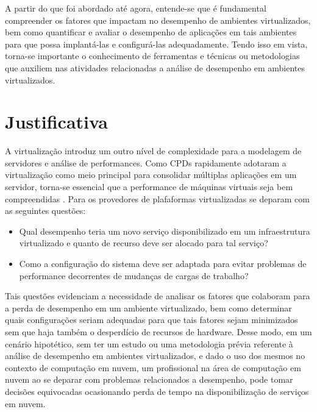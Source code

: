 A partir do que foi abordado até agora, entende-se que é fundamental compreender os fatores que impactam no desempenho de ambientes virtualizados, bem como quantificar e avaliar o desempenho de aplicações em tais ambientes para que possa implantá-las e configurá-las adequadamente. Tendo isso em vista, torna-se importante o conhecimento de ferramentas e técnicas ou metodologias que auxiliem nas atividades relacionadas a análise de desempenho em ambientes virtualizados. 



\section{Justificativa}
A virtualização introduz um outro nível de complexidade para a modelagem de servidores e análise de performances. Como CPDs rapidamente adotaram a virtualização como meio principal para consolidar múltiplas aplicações em um servidor, torna-se essencial que a performance de máquinas virtuais seja bem compreendidas \cite{ticko2010}. Para  os provedores de plafaformas virtualizadas se deparam com as seguintes questões:

\begin{itemize}
  \item Qual desempenho teria um novo serviço disponibilizado em um infraestrutura virtualizado e quanto de recurso deve ser alocado para tal serviço?

  \item Como a configuração do sistema deve ser adaptada para evitar problemas de performance decorrentes de mudanças de cargas de trabalho?
\end{itemize}


Tais questões evidenciam a necessidade de analisar os fatores que colaboram para a perda de desempenho em um ambiente virtualizado, bem como determinar quais configurações seriam adequadas para que tais fatores sejam minimizados sem que haja também o desperdício de recursos de hardware. Desse modo, em um cenário hipotético, sem ter um estudo ou uma metodologia prévia referente à análise de desempenho em ambientes virtualizados, e dado o uso dos mesmos no contexto de computação em nuvem, um profissional na área de computação em nuvem ao se deparar com problemas relacionados a desempenho, pode tomar decisões equivocadas ocasionando perda de tempo na disponibilização de serviços em nuvem.



